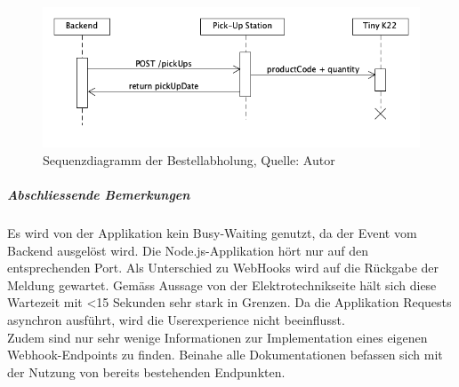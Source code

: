 \begin{figure}[H]
	\centering
	\includegraphics[width=1\textwidth]{images/orderPickUp.PNG}
	\caption[Sequenzdiagramm der Bestellabholung]{Sequenzdiagramm der Bestellabholung, Quelle: Autor}
	\label{img: stationBackendCom}
\end{figure} 
\subparagraph{Abschliessende Bemerkungen}
Es wird von der Applikation kein Busy-Waiting genutzt, da der Event vom Backend ausgelöst wird. Die Node.js-Applikation hört nur auf den entsprechenden Port. 
Als Unterschied zu \gls{WebHooks} wird auf die Rückgabe der Meldung gewartet. Gemäss Aussage von der Elektrotechnikseite hält sich diese Wartezeit mit <15 Sekunden sehr stark in Grenzen. Da die Applikation Requests asynchron ausführt, wird die Userexperience nicht beeinflusst.\\
Zudem sind nur sehr wenige Informationen zur Implementation eines eigenen Webhook-Endpoints zu finden. Beinahe alle Dokumentationen befassen sich mit der Nutzung von bereits bestehenden Endpunkten. 

